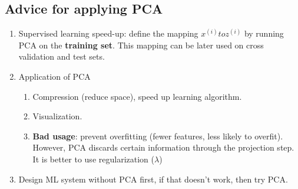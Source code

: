 \subsection{Advice for applying PCA}
    \begin{enumerate}
        \item Supervised learning speed-up: define the mapping $x^{(i)} to z^{(i)}$ by running PCA on the \textbf{training set}. This mapping can be later used on cross validation and test sets.
        \item Application of PCA
            \begin{enumerate}
                \item Compression (reduce space), speed up learning algorithm.
                \item Visualization.
                \item \textbf{Bad usage}: prevent overfitting (fewer features, less likely to overfit). However, PCA discards certain information through the projection step. It is better to use regularization ($\lambda$)
            \end{enumerate}
        \item Design ML system without PCA first, if that doesn't work, then try PCA.
    \end{enumerate}
